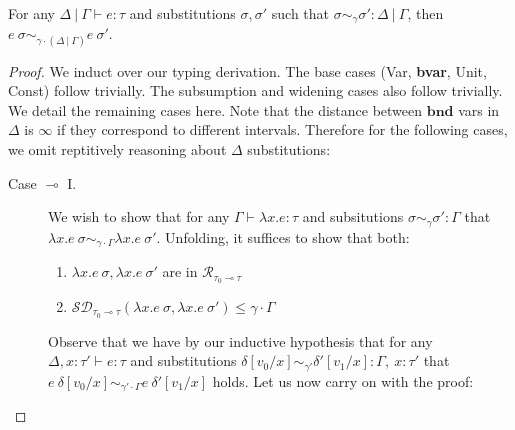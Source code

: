 \begin{theorem}
  For any $\Delta \ | \ \Gamma \vdash e : \tau$ and substitutions $\sigma, \sigma'$ such that
  $\sigma \sim_{\gamma} \sigma' : \Delta \ | \ \Gamma$, then 
  $e~\sigma \sim_{\gamma \cdot (\Delta \ | \ \Gamma)} e~\sigma'$.
\end{theorem}
\begin{proof}
  We induct over our typing derivation. The base cases (Var, \textbf{bvar},
  Unit, Const) follow trivially. The subsumption and widening cases also follow
  trivially. We detail the remaining cases here. Note that the distance between
  $\textbf{bnd}$ vars in $\Delta$ is $\infty$ if they correspond to different
  intervals. Therefore for the following cases, we omit reptitively reasoning
  about $\Delta$ substitutions:
  \begin{description}
    \item[Case $\multimap$ I.] 
      We wish to show that for any $\Gamma \vdash \lambda x . e : \tau$ and
      subsitutions $\sigma \sim_{\gamma} \sigma' : \Gamma$ that $\lambda x .
      e~\sigma \sim_{\gamma \cdot \Gamma} \lambda x . e~\sigma'$. Unfolding, it
      suffices to show that both:
      \begin{enumerate}
        \item $\lambda x . e~\sigma, \lambda x . e~\sigma'$ are in
          $\mathcal{R}_{\tau_0 \multimap \tau}$
        \item $\mathcal{SD}_{\tau_0 \multimap \tau}(\lambda x . e~\sigma,
          \lambda x . e~\sigma') \leq \gamma \cdot \Gamma$
      \end{enumerate}
    
      Observe that we have by our inductive hypothesis that for any $\Delta, x:
      \tau' \vdash e : \tau$ and substitutions 
      $\delta[v_0/x] \sim_{\gamma'} \delta'[v_1/x] : \Gamma,~x : \tau'$ that 
      $e~\delta[v_0/x] \sim_{\gamma' \cdot \Gamma} e~\delta'[v_1/x]$ holds. 
      Let us now carry on with the proof:


\end{description}
\end{proof}
